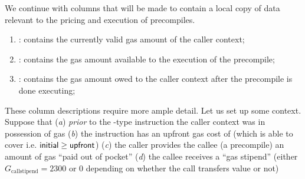\begin{enumerate}[resume]
\end{enumerate}
We continue with columns that will be made to contain a local copy of data relevant to the pricing and execution of precompiles.
\begin{enumerate}[resume]
	\item \scenPrcCurrentlyValidCallerGas:
		contains the currently valid gas amount of the caller context; 
	\item \scenPrcGasAllowance           :
		contains the gas amount available to the execution of the precompile;
	\item \scenPrcGasOwedToCaller        :
		contains the gas amount owed to the caller context after the precompile is done executing; 
\end{enumerate}
These column descriptions require more ample detail.
Let us set up some context.
Suppose that
(\emph{a}) \emph{prior} to the -type instruction the caller context was in possession of \hereInitial{} gas
(\emph{b}) the instruction has an upfront gas cost of \hereUpfront{} (which \hereInitial{} is able to cover i.e. $\textsf{initial} \geq \textsf{upfront}$)
(\emph{c}) the caller provides the callee (a precompile) an amount \herePoop{} of gas ``paid out of pocket''
(\emph{d}) the callee receives a ``gas stipend'' \hereStipend{} (either $G_\text{callstipend} = 2300$ or $0$ depending on whether the call transfers value or not)
